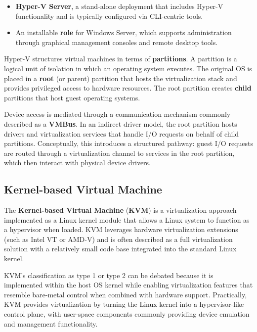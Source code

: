 \begin{itemize}
\item \textbf{Hyper-V Server}, a stand-alone deployment that includes Hyper-V functionality and is typically configured via CLI-centric tools.
\item An installable \textbf{role} for Windows Server, which supports administration through graphical management consoles and remote desktop tools.
\end{itemize}

Hyper-V structures virtual machines in terms of \textbf{partitions}. A partition is a logical unit of isolation in which an operating system executes. The original OS is placed in a \textbf{root} (or parent) partition that hosts the virtualization stack and provides privileged access to hardware resources. The root partition creates \textbf{child} partitions that host guest operating systems.

Device access is mediated through a communication mechanism commonly described as a \textbf{VMBus}. In an indirect driver model, the root partition hosts drivers and virtualization services that handle I/O requests on behalf of child partitions. Conceptually, this introduces a structured pathway: guest I/O requests are routed through a virtualization channel to services in the root partition, which then interact with physical device drivers.

\begin{center}
\end{center}

\subsection{Kernel-based Virtual Machine}

The \textbf{Kernel-based Virtual Machine} (\textbf{KVM}) is a virtualization approach implemented as a Linux kernel module that allows a Linux system to function as a hypervisor when loaded. KVM leverages hardware virtualization extensions (such as Intel VT or AMD-V) and is often described as a full virtualization solution with a relatively small code base integrated into the standard Linux kernel.

KVM's classification as type 1 or type 2 can be debated because it is implemented within the host OS kernel while enabling virtualization features that resemble bare-metal control when combined with hardware support. Practically, KVM provides virtualization by turning the Linux kernel into a hypervisor-like control plane, with user-space components commonly providing device emulation and management functionality.

